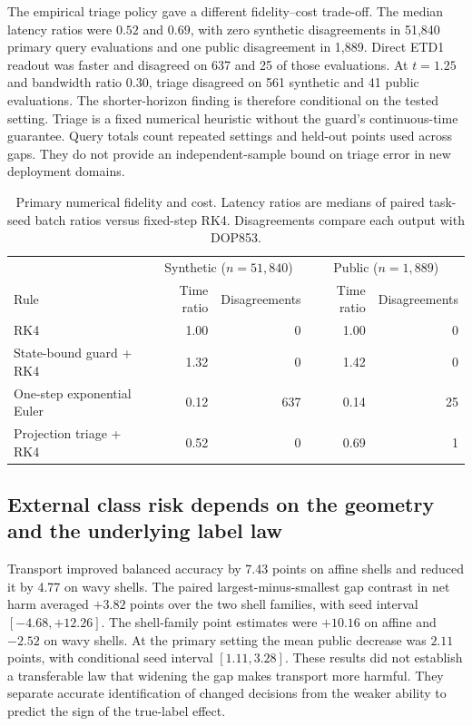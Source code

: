 The empirical triage policy gave a different fidelity--cost trade-off. The median latency ratios were $0.52$ and $0.69$, with zero synthetic disagreements in 51,840 primary query evaluations and one public disagreement in 1,889. Direct ETD1 readout was faster and disagreed on 637 and 25 of those evaluations. At $t=1.25$ and bandwidth ratio $0.30$, triage disagreed on 561 synthetic and 41 public evaluations. The shorter-horizon finding is therefore conditional on the tested setting. Triage is a fixed numerical heuristic without the guard's continuous-time guarantee. Query totals count repeated settings and held-out points used across gaps. They do not provide an independent-sample bound on triage error in new deployment domains.

\begin{table}[htbp]
\centering
\small
\caption{Primary numerical fidelity and cost. Latency ratios are medians of paired task-seed batch ratios versus fixed-step RK4. Disagreements compare each output with DOP853.}
\label{tab:cost}
\begin{tabular}{lrrrr}
\toprule
 & \multicolumn{2}{c}{Synthetic ($n=51{,}840$)} & \multicolumn{2}{c}{Public ($n=1{,}889$)}\\
Rule & Time ratio & Disagreements & Time ratio & Disagreements\\
\midrule
RK4 & 1.00 & 0 & 1.00 & 0\\
State-bound guard + RK4 & 1.32 & 0 & 1.42 & 0\\
One-step exponential Euler & 0.12 & 637 & 0.14 & 25\\
Projection triage + RK4 & 0.52 & 0 & 0.69 & 1\\
\bottomrule
\end{tabular}
\end{table}

\subsection{External class risk depends on the geometry and the underlying label law}
Transport improved balanced accuracy by 7.43 points on affine shells and reduced it by 4.77 on wavy shells. The paired largest-minus-smallest gap contrast in net harm averaged $+3.82$ points over the two shell families, with seed interval $[-4.68,+12.26]$. The shell-family point estimates were $+10.16$ on affine and $-2.52$ on wavy shells. At the primary setting the mean public decrease was $2.11$ points, with conditional seed interval $[1.11,3.28]$. These results did not establish a transferable law that widening the gap makes transport more harmful. They separate accurate identification of changed decisions from the weaker ability to predict the sign of the true-label effect.

